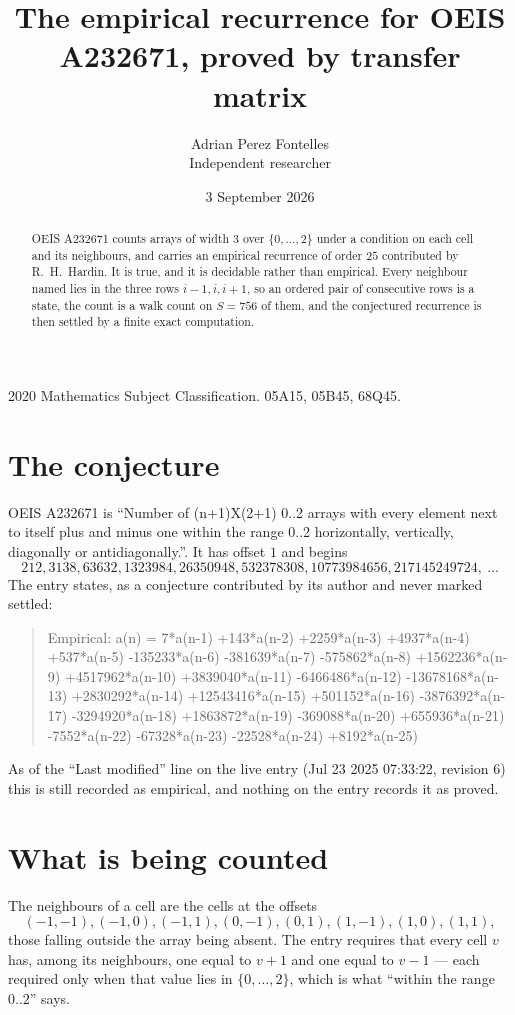 \documentclass[11pt,a4paper]{article}
\title{The empirical recurrence for OEIS A232671, proved by transfer matrix}
\author{Adrian Perez Fontelles\\ \small Independent researcher}
\date{3 September 2026}
\theoremstyle{plain}
\theoremstyle{definition}
\begin{document}
\maketitle

\begin{abstract}
OEIS A232671 counts arrays of width $3$ over $\{0,\dots,2\}$ under a condition on each cell
and its neighbours, and carries an empirical recurrence of order $25$ contributed by
R.~H.~Hardin. It is true, and it is decidable rather than empirical. Every neighbour named lies
in the three rows $i-1,i,i+1$, so an ordered pair of consecutive rows is a state, the count is
a walk count on $S=756$ of them, and the conjectured recurrence is then settled by a finite
exact computation.
\end{abstract}

\noindent\small 2020 Mathematics Subject Classification. 05A15, 05B45, 68Q45.\normalsize

\section{The conjecture}

OEIS A232671 is ``Number of (n+1)X(2+1) 0..2 arrays with every element next to itself plus and minus one within the range 0..2 horizontally, vertically, diagonally or antidiagonally.''. It has offset $1$ and begins
\[
212, 3138, 63632, 1323984, 26350948, 532378308, 10773984656, 217145249724,\ \dots
\]
The entry states, as a conjecture contributed by its author and never marked settled:
\begin{quote}
Empirical: a(n) = 7*a(n-1) +143*a(n-2) +2259*a(n-3) +4937*a(n-4) +537*a(n-5) -135233*a(n-6) -381639*a(n-7) -575862*a(n-8) +1562236*a(n-9) +4517962*a(n-10) +3839040*a(n-11) -6466486*a(n-12) -13678168*a(n-13) +2830292*a(n-14) +12543416*a(n-15) +501152*a(n-16) -3876392*a(n-17) -3294920*a(n-18) +1863872*a(n-19) -369088*a(n-20) +655936*a(n-21) -7552*a(n-22) -67328*a(n-23) -22528*a(n-24) +8192*a(n-25)
\end{quote}
As of the ``Last modified'' line on the live entry (Jul 23 2025 07:33:22, revision 6) this is still
recorded as empirical, and nothing on the entry records it as proved.

\section{What is being counted}

The neighbours of a cell are the cells at the offsets
\[
(-1,-1), (-1,0), (-1,1), (0,-1), (0,1), (1,-1), (1,0), (1,1),
\]
those falling outside the array being absent. The entry requires that every cell $v$ has, among its neighbours, one equal to $v+1$ and one equal to $v-1$ --- each required only when that value lies in $\{0,\dots,2\}$, which is what ``within the range $0..2$'' says.
\end{document}
